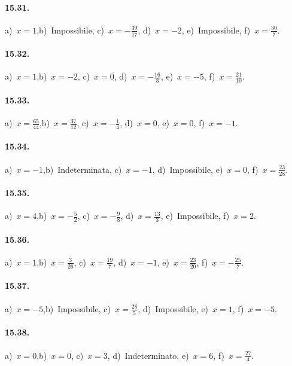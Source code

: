 \paragraph{15.31.}
a)~$x=1$,\quad b)~Impossibile, \quad c)~$x=-{\frac{39}{17}}$, \quad d)~$x=-2$, \quad e)~Impossibile, \quad f)~$x=\frac{30}{7}$.

\paragraph{15.32.}
a)~$x=1$,\quad b)~$x=-2$, \quad c)~$x=0$, \quad d)~$x=-\frac{16}{3}$, \quad e)~$x=-5$, \quad f)~$x=\frac{21}{10}$.

\paragraph{15.33.}
a)~$x=\frac{65}{44}$,\quad b)~$x=\frac{37}{12}$, \quad c)~$x=-{\frac{1}{4}}$, \quad d)~$x=0$, \quad e)~$x=0$, \quad f)~$x=-1$.

\paragraph{15.34.}
a)~$x=-1$,\quad b)~Indeterminata, \quad c)~$x=-1$, \quad d)~Impossibile, \quad e)~$x=0$, \quad f)~$x=\frac{23}{28}$.

\paragraph{15.35.}
a)~$x=4$,\quad b)~$x=-{\frac{5}{2}}$, \quad c)~$x=-{\frac{9}{8}}$, \quad d)~$x=\frac{13}{3}$, \quad e)~Impossibile, \quad f)~$x=2$.

\paragraph{15.36.}
a)~$x=1$,\quad b)~$x=\frac{3}{26}$, \quad c)~$x=\frac{19}{7}$, \quad d)~$x=-1$, \quad e)~$x=\frac{23}{20}$, \quad f)~$x=-{\frac{25}{7}}$.

\paragraph{15.37.}
a)~$x=-5$,\quad b)~Impossibile, \quad c)~$x=\frac{28}{5}$, \quad d)~Impossibile, \quad e)~$x=1$, \quad f)~$x=-5$.

\paragraph{15.38.}
a)~$x=0$,\quad b)~$x=0$, \quad c)~$x=3$, \quad d)~Indeterminato, \quad e)~$x=6$, \quad f)~$x=\frac{27}{4}$.

